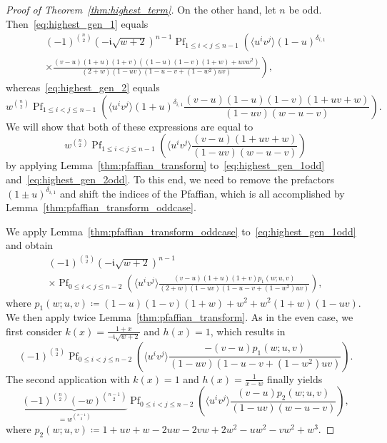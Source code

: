 \documentclass[ALCO, Unicode]{cedram}
\DeclareMathOperator*{\pf}{Pf}
\newcommand{\imag}{\mathfrak{i}}
\begin{document}
\begin{proof}[Proof of Theorem~\ref{thm:highest_term}]
		On the other hand, let $n$ be odd. Then~\eqref{eq:highest_gen_1} equals
		\begin{multline}\label{eq:highest_gen_1odd}
			(-1)^{\binom{n}{2}} (- \imag \sqrt{w+2})^{n-1} \pf_{1 \le i < j \le n-1} \left(\langle u^i v^j\rangle  (1-u)^{\delta_{i,1}} \right.\\
			\left. \times  \frac{(v-u)(1+u)(1+v)((1-u)(1-v)(1+w)+u v w^2)}{(2+w)(1-u v)(1-u-v+(1-w^2)u v)} \right),
		\end{multline}
		whereas~\eqref{eq:highest_gen_2} equals
		\begin{equation}\label{eq:highest_gen_2odd}
			w^{\binom{n}{2}} \pf_{1 \le i < j \le n-1} \left(\langle u^i v^j\rangle (1+u)^{\delta_{i,1}} \frac{(v-u)(1-u)(1-v)(1+u v+w)}{(1-u v)(w-u-v)} \right).
		\end{equation}
		We will show that both of these expressions are equal to
		\begin{equation}\label{eq:pfaffian_DSASM_odd}
			w^{\binom{n}{2}} \pf_{1 \le i < j \le n-1} \left(\langle u^i v^j\rangle \frac{(v-u)(1+u v+w)}{(1-u v)(w- u-v)} \right)
		\end{equation}
		by applying Lemma~\ref{thm:pfaffian_transform} to~\eqref{eq:highest_gen_1odd} and~\eqref{eq:highest_gen_2odd}. To this end, we need to remove the prefactors $(1 \pm u)^{\delta_{i,1}}$ and shift the indices of the Pfaffian, which is all accomplished by Lemma~\ref{thm:pfaffian_transform_oddcase}.
		
		We apply Lemma~\ref{thm:pfaffian_transform_oddcase} to~\eqref{eq:highest_gen_1odd} and obtain
		\begin{multline*}
			(-1)^{\binom{n}{2}} (- \imag \sqrt{w+2})^{n-1}\\
			\times \pf_{0 \le i < j \le n-2} \left(\langle u^i v^j\rangle  \frac{(v-u)(1+u)(1+v)p_1(w;u,v)}{(2+w)(1-u v)(1-u-v+(1-w^2)u v)} \right),
		\end{multline*}
		where $p_1(w;u,v) \coloneqq (1-u)(1-v)(1+w)+w^2+w^2 (1+w) (1-u v)$. We then apply twice Lemma~\ref{thm:pfaffian_transform}. As in the even case, we first consider $k(x)=\frac{1+x}{- \imag \sqrt{w+2}}$ and $h(x)=1$, which results in
		\begin{equation*}
			(-1)^{\binom{n}{2}} \pf_{0 \le i < j \le n-2} \left(\langle u^i v^j\rangle \frac{-(v-u) p_1(w;u,v)}{(1-u v)(1-u-v+(1-w^2)u v)} \right).
		\end{equation*}
		The second application with $k(x)=1$ and $h(x)=\frac{1}{x-w}$ finally yields
		\begin{equation}\label{eq:highest_gen_odd_equal}
			\underbrace{(-1)^{\binom{n}{2}} (-w)^{\binom{n-1}{2}}}_{=w^{\binom{n-1}{2}}} \pf_{0 \le i < j \le n-2} \left(\langle u^i v^j\rangle  \frac{(v-u)p_2(w;u,v)}{(1-u v)(w-u-v)} \right),
		\end{equation}
		where $p_2(w;u,v) \coloneqq 1+u v+w-2 u w-2 v w+2 w^2-u w^2-v w^2+w^3$.
		

\end{proof}
\end{document}
